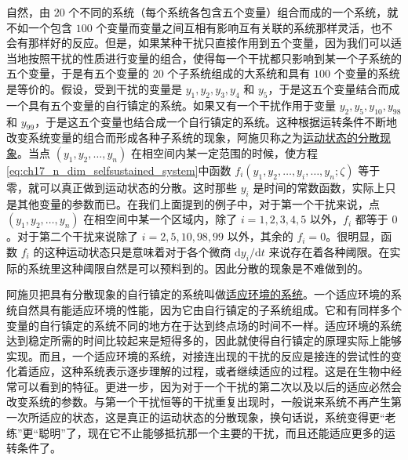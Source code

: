 自然，由 $20$ 个不同的系统（每个系统各包含五个变量）组合而成的一个系统，就不如一个包含 $100$ 个变量而变量之间互相有影响互有关联的系统那样灵活，也不会有那样好的反应。但是，如果某种干扰只直接作用到五个变量，因为我们可以适当地按照干扰的性质进行变量的组合，使得每一个干扰都只影响到某一个子系统的五个变量，于是有五个变量的 $20$ 个子系统组成的大系统和具有 $100$ 个变量的系统是等价的。假设，受到干扰的变量是 $y_1,y_2,y_3,y_4$ 和 $y_5$，于是这五个变量结合而成一个具有五个变量的自行镇定的系统。如果又有一个干扰作用于变量 $y_2,y_5,y_{10},y_{98}$ 和 $y_{99}$，于是这五个变量也结合成一个自行镇定的系统。这种根据运转条件不断地改变系统变量的组合而形成各种子系统的现象，阿施贝称之为\underline{运动状态的分散现象}。当点 $(y_1,y_2,\dots,y_n)$ 在相空间内某一定范围的时候，使方程\eqref{eq:ch17_n_dim_selfsustained_system}中函数 $f_i(y_1,y_2,\dots,y_i,\dots,y_n;\zeta)$ 等于零，就可以真正做到运动状态的分散。这时那些 $y_i$ 是时间的常数函数，实际上只是其他变量的参数而已。在我们上面提到的例子中，对于第一个干扰来说，点 $(y_1,y_2,\dots,y_n)$ 在相空间中某一个区域内，除了 $i=1,2,3,4,5$ 以外，$f_i$ 都等于 $0$。对于第二个干扰来说除了 $i=2,5,10,98,99$ 以外，其余的 $f_i=0$。很明显，函数 $f_i$ 的这种运动状态只是意味着对于各个微商 $\mathrm{d}y_i/\mathrm{d}t$ 来说存在着各种阈限。在实际的系统里这种阈限自然是可以预料到的。因此分散的现象是不难做到的。

阿施贝把具有分散现象的自行镇定的系统叫做\underline{适应环境的系统}。一个适应环境的系统自然具有能适应环境的性能，因为它由自行镇定的子系统组成。它和有同样多个变量的自行镇定的系统不同的地方在于达到终点场的时间不一样。适应环境的系统达到稳定所需的时间比较起来是短得多的，因此就使得自行镇定的原理实际上能够实现。而且，一个适应环境的系统，对接连出现的干扰的反应是接连的尝试性的变化着适应，这种系统表示逐步理解的过程，或者继续适应的过程。这是在生物中经常可以看到的特征。更进一步，因为对于一个干扰的第二次以及以后的适应必然会改变系统的参数。与第一个干扰恒等的干扰重复出现时，一般说来系统不再产生第一次所适应的状态，这是真正的运动状态的分散现象，换句话说，系统变得更“老练”更“聪明”了，现在它不止能够抵抗那一个主要的干扰，而且还能适应更多的运转条件了。
